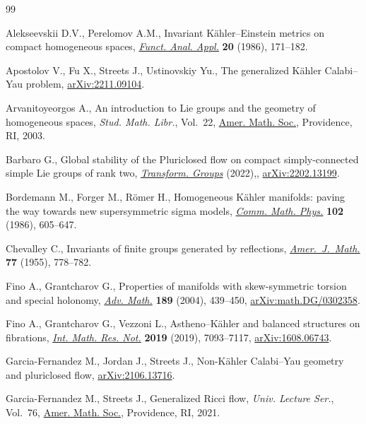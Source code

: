 \documentclass[10pt,a4paper]{amsart}
\numberwithin{equation}{section}
\begin{document}
\begin{thebibliography}{99}
\footnotesize\itemsep=0pt

Alekseevskii D.V., Perelomov A.M., Invariant {K}\"ahler--{E}instein metrics on
 compact homogeneous spaces, \href{https://doi.org/10.1007/BF01078469}{\textit{Funct. Anal. Appl.}} \textbf{20} (1986),
 171--182.

Apostolov V., Fu X., Streets J., Ustinovskiy Yu., The generalized K\"ahler
 Calabi--Yau problem, \href{https://arxiv.org/abs/2211.09104}{arXiv:2211.09104}.

Arvanitoyeorgos A., An introduction to {L}ie groups and the geometry of
 homogeneous spaces, \textit{Stud. Math. Libr.}, Vol.~22, \href{https://doi.org/10.1090/stml/022}{Amer. Math. Soc.},
 Providence, RI, 2003.

Barbaro G., Global stability of the {P}luriclosed flow on compact
 simply-connected simple {L}ie groups of rank two, \href{https://doi.org/10.1007/s00031-022-09761-5}{\textit{Transform. Groups}}
 (2022),, \href{https://arxiv.org/abs/2202.13199}{arXiv:2202.13199}.

Bordemann M., Forger M., R\"omer H., Homogeneous {K}\"ahler manifolds: paving
 the way towards new supersymmetric sigma models, \href{https://doi.org/10.1007/BF01221650}{\textit{Comm. Math. Phys.}}
 \textbf{102} (1986), 605--647.

Chevalley C., Invariants of finite groups generated by reflections,
 \href{https://doi.org/10.2307/2372597}{\textit{Amer.~J.~Math.}} \textbf{77} (1955), 778--782.

Fino A., Grantcharov G., Properties of manifolds with skew-symmetric torsion
 and special holonomy, \href{https://doi.org/10.1016/j.aim.2003.10.009}{\textit{Adv. Math.}} \textbf{189} (2004), 439--450,
 \href{https://arxiv.org/abs/math.DG/0302358}{arXiv:math.DG/0302358}.

Fino A., Grantcharov G., Vezzoni L., Astheno--{K}\"ahler and balanced
 structures on fibrations, \href{https://doi.org/10.1093/imrn/rnx337}{\textit{Int. Math. Res. Not.}} \textbf{2019} (2019),
 7093--7117, \href{https://arxiv.org/abs/1608.06743}{arXiv:1608.06743}.

Garcia-Fernandez M., Jordan J., Streets J., Non-{K}\"ahler {C}alabi--{Y}au
 geometry and pluriclosed flow, \href{https://arxiv.org/abs/2106.13716}{arXiv:2106.13716}.

Garcia-Fernandez M., Streets J., Generalized {R}icci flow, \textit{Univ.
 Lecture Ser.}, Vol.~76, \href{https://doi.org/10.1090/ulect/076}{Amer. Math. Soc.}, Providence, RI, 2021.


\end{thebibliography}
\end{document}
